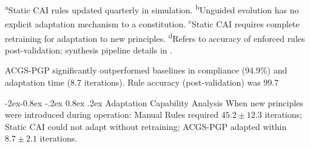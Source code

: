 \documentclass[manuscript,screen,9pt]{acmart}
\makeatletter
\renewcommand\subsubsection{\@startsection{subsubsection}{3}{\z@}%
  {-2ex\@plus -0.8ex \@minus -.2ex}%
  {0.8ex \@plus .2ex}%
  {\normalfont\normalsize\bfseries}}
\makeatother
\begin{document}
\begin{table}[htbp]
\begin{minipage}{\linewidth}\footnotesize \textsuperscript{a}Static CAI rules updated quarterly in simulation. \textsuperscript{b}Unguided evolution has no explicit adaptation mechanism to a constitution. \textsuperscript{c}Static CAI requires complete retraining for adaptation to new principles. \textsuperscript{d}Refers to accuracy of enforced rules post-validation; synthesis pipeline details in .\end{minipage}
\end{table}
ACGS-PGP significantly outperformed baselines in compliance (94.9\%) and adaptation time (8.7 iterations). Rule accuracy (post-validation) was 99.7%

\subsubsection{Adaptation Capability Analysis}
When new principles were introduced during operation: Manual Rules required $45.2 \pm 12.3$ iterations; Static CAI could not adapt without retraining; ACGS-PGP adapted within $8.7 \pm 2.1$ iterations.
\end{document}
